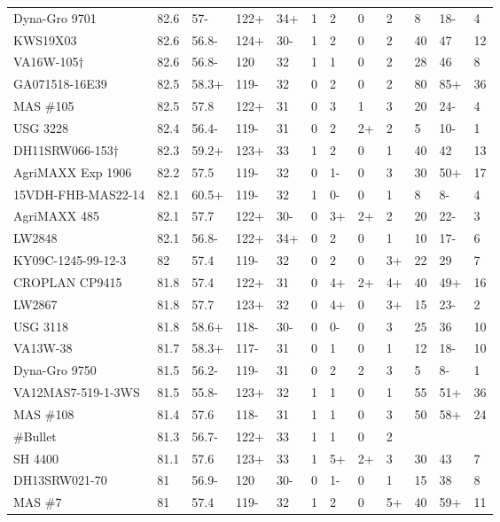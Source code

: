 \documentclass[12pt, letterpaper]{article}
\begin{document}
\begin{landscape}
\begin{ThreePartTable}
\begin{longtable}{llllllllllll}
  Dyna-Gro 9701 & 82.6 & 57- & 122+ & 34+ & 1 & 2 & 0 & 2 & 8 & 18- & 4 \\ 
  KWS19X03 & 82.6 & 56.8- & 124+ & 30- & 1 & 2 & 0 & 2 & 40 & 47 & 12 \\ 
  VA16W-105† & 82.6 & 56.8- & 120 & 32 & 1 & 1 & 0 & 2 & 28 & 46 & 8 \\ 
  GA071518-16E39 & 82.5 & 58.3+ & 119- & 32 & 0 & 2 & 0 & 2 & 80 & 85+ & 36 \\ 
  MAS \#105 & 82.5 & 57.8 & 122+ & 31 & 0 & 3 & 1 & 3 & 20 & 24- & 4 \\ 
  USG 3228 & 82.4 & 56.4- & 119- & 31 & 0 & 2 & 2+ & 2 & 5 & 10- & 1 \\ 
  DH11SRW066-153† & 82.3 & 59.2+ & 123+ & 33 & 1 & 2 & 0 & 1 & 40 & 42 & 13 \\ 
  AgriMAXX Exp 1906 & 82.2 & 57.5 & 119- & 32 & 0 & 1- & 0 & 3 & 30 & 50+ & 17 \\ 
  15VDH-FHB-MAS22-14 & 82.1 & 60.5+ & 119- & 32 & 1 & 0- & 0 & 1 & 8 & 8- & 4 \\ 
  AgriMAXX 485 & 82.1 & 57.7 & 122+ & 30- & 0 & 3+ & 2+ & 2 & 20 & 22- & 3 \\ 
  LW2848 & 82.1 & 56.8- & 122+ & 34+ & 0 & 2 & 0 & 1 & 10 & 17- & 6 \\ 
  KY09C-1245-99-12-3 & 82 & 57.4 & 119- & 32 & 0 & 2 & 0 & 3+ & 22 & 29 & 7 \\ 
  CROPLAN CP9415 & 81.8 & 57.4 & 122+ & 31 & 0 & 4+ & 2+ & 4+ & 40 & 49+ & 16 \\ 
  LW2867 & 81.8 & 57.7 & 123+ & 32 & 0 & 4+ & 0 & 3+ & 15 & 23- & 2 \\ 
  USG 3118 & 81.8 & 58.6+ & 118- & 30- & 0 & 0- & 0 & 3 & 25 & 36 & 10 \\ 
  VA13W-38 & 81.7 & 58.3+ & 117- & 31 & 0 & 1 & 0 & 1 & 12 & 18- & 10 \\ 
  Dyna-Gro 9750 & 81.5 & 56.2- & 119- & 31 & 0 & 2 & 2 & 3 & 5 & 8- & 1 \\ 
  VA12MAS7-519-1-3WS & 81.5 & 55.8- & 123+ & 32 & 1 & 1 & 0 & 1 & 55 & 51+ & 36 \\ 
  MAS \#108 & 81.4 & 57.6 & 118- & 31 & 1 & 1 & 0 & 3 & 50 & 58+ & 24 \\ 
  \#Bullet & 81.3 & 56.7- & 122+ & 33 & 1 & 1 & 0 & 2 &  &  &  \\ 
  SH 4400 & 81.1 & 57.6 & 123+ & 33 & 1 & 5+ & 2+ & 3 & 30 & 43 & 7 \\ 
  DH13SRW021-70 & 81 & 56.9- & 120 & 30- & 0 & 1- & 0 & 1 & 15 & 38 & 8 \\ 
  MAS \#7 & 81 & 57.4 & 119- & 32 & 1 & 2 & 0 & 5+ & 40 & 59+ & 11 \\ 

\end{longtable}
\end{ThreePartTable}
\end{landscape}
\end{document}
